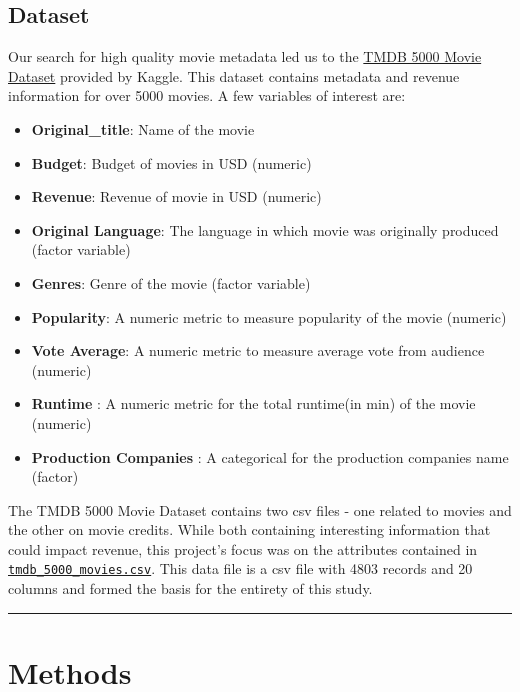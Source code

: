 \documentclass[
]{article}
\providecommand{\tightlist}{%
  \setlength{\itemsep}{0pt}\setlength{\parskip}{0pt}}
\begin{document}
\hypertarget{dataset}{%
\subsection{Dataset}\label{dataset}}

Our search for high quality movie metadata led us to the
\href{https://www.kaggle.com/tmdb/tmdb-movie-metadata?select=tmdb_5000_movies.csv}{TMDB
5000 Movie Dataset} provided by Kaggle. This dataset contains metadata
and revenue information for over 5000 movies. A few variables of
interest are:

\begin{itemize}
\tightlist
\item
  \textbf{Original\_title}: Name of the movie
\item
  \textbf{Budget}: Budget of movies in USD (numeric)
\item
  \textbf{Revenue}: Revenue of movie in USD (numeric)
\item
  \textbf{Original Language}: The language in which movie was originally
  produced (factor variable)
\item
  \textbf{Genres}: Genre of the movie (factor variable)
\item
  \textbf{Popularity}: A numeric metric to measure popularity of the
  movie (numeric)
\item
  \textbf{Vote Average}: A numeric metric to measure average vote from
  audience (numeric)
\item
  \textbf{Runtime} : A numeric metric for the total runtime(in min) of
  the movie (numeric)
\item
  \textbf{Production Companies} : A categorical for the production
  companies name (factor)
\end{itemize}

The TMDB 5000 Movie Dataset contains two csv files - one related to
movies and the other on movie credits. While both containing interesting
information that could impact revenue, this project's focus was on the
attributes contained in
\href{tmdb_5000_movies.csv}{\texttt{tmdb\_5000\_movies.csv}}. This data
file is a csv file with 4803 records and 20 columns and formed the basis
for the entirety of this study.

\begin{center}\rule{0.5\linewidth}{0.5pt}\end{center}

\hypertarget{methods}{%
\section{Methods}\label{methods}}
\end{document}
